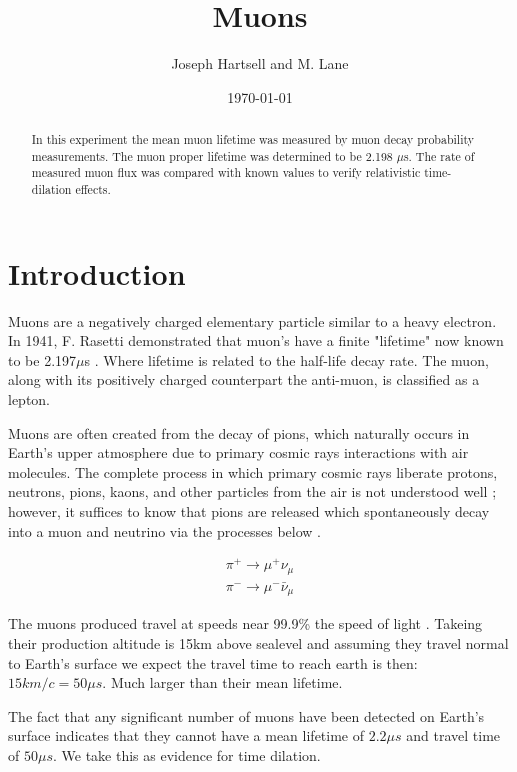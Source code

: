 \documentclass[12pt,twocolumn]{article}
\begin{document}
\title{Muons}
\author{Joseph Hartsell and M. Lane}
\date{\today}

\maketitle


\begin{abstract}
In this experiment the mean muon lifetime was measured by muon decay probability
measurements. The muon proper lifetime was determined to be 2.198 $\mu$s. The rate of
measured muon flux was compared with known values to verify relativistic time-dilation
effects.
\end{abstract}

\section{Introduction}
Muons are a negatively charged elementary particle similar to a heavy electron. In 1941,
F. Rasetti demonstrated that muon's have a finite "lifetime" now known to be 2.197$\mu$s
\cite{COSBUL}. Where lifetime is related to the half-life decay rate.
The muon, along with its positively charged counterpart the anti-muon, is
classified as a lepton.

Muons are often created from the decay of pions, which naturally occurs in Earth's upper
atmosphere due to primary cosmic rays interactions with air molecules. The complete process
in which primary cosmic rays liberate protons, neutrons, pions, kaons, and other particles
from the air is not understood well \cite{MUON}; however, it suffices to know that pions are released
which spontaneously decay into a muon and neutrino via the processes below \cite{MUON}.

\begin{equation}
	\label{eq:PionDecay}
	\begin{array}{c}
	\pi^{+}\rightarrow\mu^{+}\nu_{\mu} \\
	\pi^{-}\rightarrow\mu^{-}\bar{\nu}_{\mu}
\end{array}
\end{equation}

The muons produced travel at speeds near 99.9\% the speed of light \cite{PDG}. Takeing their production
altitude is 15km above sealevel\cite{PDG} and assuming they travel normal to Earth's surface we expect
the travel time to reach earth is then: $15km/c = 50\mu s$. Much larger than their mean lifetime.

The fact that any significant number of muons have been detected on Earth's surface indicates that they
cannot have a mean lifetime of $2.2\mu s$ and travel time of $50\mu s$. We take this as evidence for time
dilation.
\end{document}
